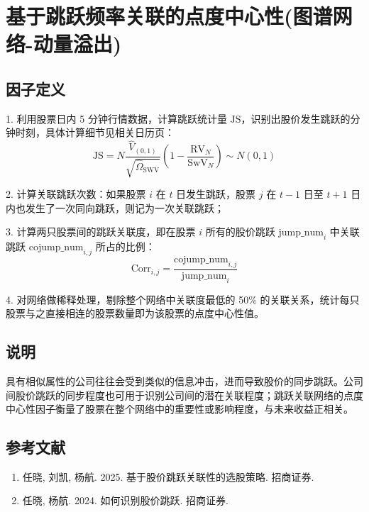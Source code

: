 \documentclass{article}
\begin{document}
\section{基于跳跃频率关联的点度中心性(图谱网络-动量溢出)}

\subsection{因子定义}

1. 利用股票日内 5 分钟行情数据，计算跳跃统计量 \( \mathrm{JS} \)，识别出股价发生跳跃的分钟时刻，具体计算细节见相关日历页：
\begin{equation}
    \mathrm{JS} = N \frac{\hat{V}_{(0,1)}}{\sqrt{\hat{\Omega}_{\mathrm{SWV}}}} \left( 1 - \frac{\mathrm{RV}_N}{\mathrm{SwV}_N} \right) \sim N(0,1)
\end{equation}

2. 计算关联跳跃次数：如果股票 \( i \) 在 \( t \) 日发生跳跃，股票 \( j \) 在 \( t-1 \) 日至 \( t+1 \) 日内也发生了一次同向跳跃，则记为一次关联跳跃；

3. 计算两只股票间的跳跃关联度，即在股票 \( i \) 所有的股价跳跃 \( \mathrm{jump\_num}_i \) 中关联跳跃 \( \mathrm{cojump\_num}_{i,j} \) 所占的比例：
\begin{equation}
    \mathrm{Corr}_{i,j} = \frac{\mathrm{cojump\_num}_{i,j}}{\mathrm{jump\_num}_i}
\end{equation}

4. 对网络做稀释处理，剔除整个网络中关联度最低的 50\% 的关联关系，统计每只股票与之直接相连的股票数量即为该股票的点度中心性值。

\subsection{说明}
具有相似属性的公司往往会受到类似的信息冲击，进而导致股价的同步跳跃。公司间股价跳跃的同步程度也可用于识别公司间的潜在关联程度；跳跃关联网络的点度中心性因子衡量了股票在整个网络中的重要性或影响程度，与未来收益正相关。

\subsection{参考文献}
\begin{enumerate}
    \item 任晓, 刘凯, 杨航. 2025. 基于股价跳跃关联性的选股策略. 招商证券.
    \item 任晓, 杨航. 2024. 如何识别股价跳跃. 招商证券.
\end{enumerate}
\end{document}

